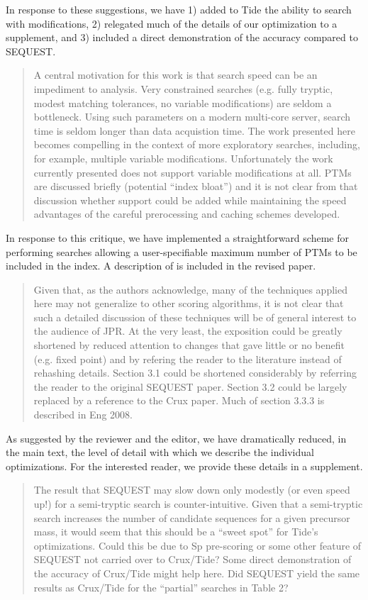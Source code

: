 \documentclass{article}
\newcommand{\breview}{\begin{quotation}\begin{em}\noindent}
\newcommand{\ereview}{\end{em}\end{quotation}}
\begin{document}
In response to these suggestions, we have 1) added to Tide the ability
to search with modifications, 2) relegated much of the details of our
optimization to a supplement, and 3) included a direct demonstration
of the accuracy compared to SEQUEST.

\breview A central motivation for this work is that search speed can
be an impediment to analysis. Very constrained searches (e.g. fully
tryptic, modest matching tolerances, no variable modifications) are
seldom a bottleneck. Using such parameters on a modern multi-core
server, search time is seldom longer than data acquistion time. The
work presented here becomes compelling in the context of more
exploratory searches, including, for example, multiple variable
modifications. Unfortunately the work currently presented does not
support variable modifications at all. PTMs are discussed briefly
(potential ``index bloat'') and it is not clear from that discussion
whether support could be added while maintaining the speed advantages
of the careful prerocessing and caching schemes developed. \ereview

In response to this critique, we have implemented a straightforward
scheme for performing searches allowing a user-specifiable maximum
number of PTMs to be included in the index. A description of is
included in the revised paper.

\breview Given that, as the authors acknowledge, many of the
techniques applied here may not generalize to other scoring
algorithms, it is not clear that such a detailed discussion of these
techniques will be of general interest to the audience of JPR. At the
very least, the exposition could be greatly shortened by reduced
attention to changes that gave little or no benefit (e.g. fixed point)
and by refering the reader to the literature instead of rehashing
details. Section 3.1 could be shortened considerably by referring the
reader to the original SEQUEST paper. Section 3.2 could be largely
replaced by a reference to the Crux paper. Much of section 3.3.3 is
described in Eng 2008. \ereview

As suggested by the reviewer and the editor, we have dramatically
reduced, in the main text, the level of detail with which we describe
the individual optimizations.  For the interested reader, we provide
these details in a supplement.

\breview The result that SEQUEST may slow down only modestly (or even
speed up!) for a semi-tryptic search is counter-intuitive. Given that
a semi-tryptic search increases the number of candidate sequences for
a given precursor mass, it would seem that this should be a ``sweet
spot'' for Tide's optimizations. Could this be due to Sp pre-scoring or
some other feature of SEQUEST not carried over to Crux/Tide? Some
direct demonstration of the accuracy of Crux/Tide might help here. Did
SEQUEST yield the same results as Crux/Tide for the ``partial'' searches
in Table 2? \ereview
\end{document}
